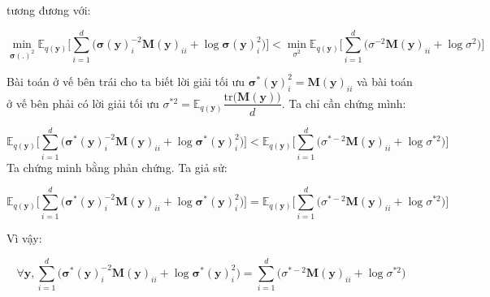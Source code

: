 \documentclass[14pt, a4paper]{article}
\numberwithin{equation}{section}
\numberwithin{figure}{section}
\numberwithin{dl}{section}
\numberwithin{md}{section}
\numberwithin{bd}{section}
\numberwithin{dn}{section}
\numberwithin{hq}{section}
\begin{document}
    tương đương với:

    \begin{equation}
        \min_{\boldsymbol{\sigma}(.)^2} \mathbb{E}_{q(\boldsymbol{y})} \Bigg \lbrack \sum_{i=1}^d \big( \boldsymbol{\sigma} (\boldsymbol{y})_i^{-2} \boldsymbol{M} (\boldsymbol{y})_{ii} + \log \boldsymbol{\sigma} (\boldsymbol{y})_i^2 \big) \Bigg \rbrack < \min_{\sigma^2} \mathbb{E}_{q(\boldsymbol{y})} \Bigg \lbrack \sum_{i=1}^d \big( \sigma^{-2} \boldsymbol{M} (\boldsymbol{y})_{ii} + \log \sigma^2 \big) \Bigg \rbrack
    \end{equation}

    Bài toán ở vế bên trái cho ta biết lời giải tối ưu $\boldsymbol{\sigma}^{\ast}(\boldsymbol{y})_i^2=\boldsymbol{M} (\boldsymbol{y})_{ii}$ và bài toán ở vế bên phải có lời giải tối ưu $\sigma^{\ast 2}=\mathbb{E}_{q(\boldsymbol{y})} \dfrac{\mathrm{tr}\big( \boldsymbol{M} (\boldsymbol{y}) \big)}{d}$.
    Ta chỉ cần chứng mình:

    \begin{equation} \label{eq:Inequality-Mixture-Of-Gaussian}
        \mathbb{E}_{q(\boldsymbol{y})} \Bigg \lbrack \sum_{i=1}^d \big( \boldsymbol{\sigma}^{\ast} (\boldsymbol{y})_i^{-2} \boldsymbol{M} (\boldsymbol{y})_{ii} + \log \boldsymbol{\sigma}^{\ast} (\boldsymbol{y})_i^2 \big) \Bigg \rbrack < \mathbb{E}_{q(\boldsymbol{y})} \Bigg \lbrack \sum_{i=1}^d \big( \sigma^{\ast -2} \boldsymbol{M} (\boldsymbol{y})_{ii} + \log \sigma^{\ast 2} \big) \Bigg \rbrack
    \end{equation}
    Ta chứng minh bằng phản chứng. Ta giả sử:

    \begin{equation}
        \mathbb{E}_{q(\boldsymbol{y})} \Bigg \lbrack \sum_{i=1}^d \big( \boldsymbol{\sigma}^{\ast} (\boldsymbol{y})_i^{-2} \boldsymbol{M} (\boldsymbol{y})_{ii} + \log \boldsymbol{\sigma}^{\ast} (\boldsymbol{y})_i^2 \big) \Bigg \rbrack = \mathbb{E}_{q(\boldsymbol{y})} \Bigg \lbrack \sum_{i=1}^d \big( \sigma^{\ast -2} \boldsymbol{M} (\boldsymbol{y})_{ii} + \log \sigma^{\ast 2} \big) \Bigg \rbrack
    \end{equation}

    Vì vậy:

    \begin{equation}
        \forall \boldsymbol{y}, \sum_{i=1}^d \big( \boldsymbol{\sigma}^{\ast} (\boldsymbol{y})_i^{-2} \boldsymbol{M} (\boldsymbol{y})_{ii} + \log \boldsymbol{\sigma}^{\ast} (\boldsymbol{y})_i^2 \big) = \sum_{i=1}^d \big( \sigma^{\ast -2} \boldsymbol{M} (\boldsymbol{y})_{ii} + \log \sigma^{\ast 2} \big)
    \end{equation}
\end{document}
